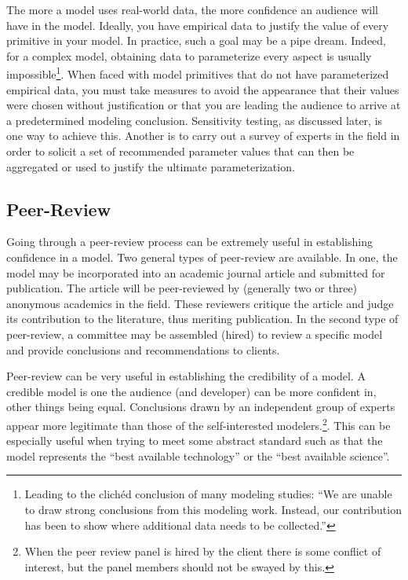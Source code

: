 \documentclass[]{memoir}
\begin{document}
The more a model uses real-world data, the more confidence an audience
will have in the model. Ideally, you have empirical data to justify the
value of every primitive in your model. In practice, such a goal may be
a pipe dream. Indeed, for a complex model, obtaining data to
parameterize every aspect is usually impossible\footnote{Leading to the
  clichéd conclusion of many modeling studies: ``We are unable to draw
  strong conclusions from this modeling work. Instead, our contribution
  has been to show where additional data needs to be collected.''}. When
faced with model primitives that do not have parameterized empirical
data, you must take measures to avoid the appearance that their values
were chosen without justification or that you are leading the audience
to arrive at a predetermined modeling conclusion. Sensitivity testing,
as discussed later, is one way to achieve this. Another is to carry out
a survey of experts in the field in order to solicit a set of
recommended parameter values that can then be aggregated or used to
justify the ultimate parameterization.

\subsection{Peer-Review}

Going through a peer-review process can be extremely useful in
establishing confidence in a model. Two general types of peer-review are
available. In one, the model may be incorporated into an academic
journal article and submitted for publication. The article will be
peer-reviewed by (generally two or three) anonymous academics in the
field. These reviewers critique the article and judge its contribution
to the literature, thus meriting publication. In the second type of
peer-review, a committee may be assembled (hired) to review a specific
model and provide conclusions and recommendations to clients.

Peer-review can be very useful in establishing the credibility of a
model. A credible model is one the audience (and developer) can be more
confident in, other things being equal. Conclusions drawn by an
independent group of experts appear more legitimate than those of the
self-interested modelers.\footnote{When the peer review panel is hired
  by the client there is some conflict of interest, but the panel
  members should not be swayed by this.}. This can be especially useful
when trying to meet some abstract standard such as that the model
represents the ``best available technology'' or the ``best available
science''.
\end{document}
